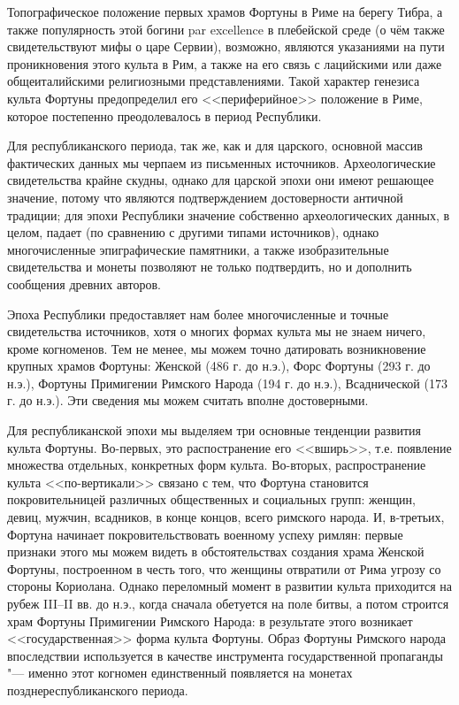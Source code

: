 Топографическое положение первых храмов Фортуны в Риме на берегу Тибра, а также популярность этой богини par excellence в плебейской среде (о чём также свидетельствуют мифы о царе Сервии), возможно, являются указаниями на пути проникновения этого культа в Рим, а также на его связь с лацийскими или даже общеиталийскими религиозными представлениями. Такой характер генезиса культа Фортуны предопределил его <<периферийное>> положение в Риме, которое постепенно преодолевалось в период Республики.


Для республиканского периода, так же, как и для царского, основной массив фактических данных мы черпаем из письменных источников. Археологические свидетельства крайне скудны, однако для царской эпохи они имеют решающее значение, потому что являются подтверждением достоверности античной традиции; для эпохи Республики значение собственно археологических данных, в целом, падает (по сравнению с другими типами источников), однако многочисленные эпиграфические памятники, а также изобразительные свидетельства и монеты позволяют не только подтвердить, но и дополнить сообщения древних авторов.

Эпоха Республики предоставляет нам более многочисленные и точные свидетельства источников, хотя о многих формах культа мы не знаем ничего, кроме когноменов. Тем не менее, мы можем точно датировать возникновение крупных храмов Фортуны: Женской (486 г. до н.э.), Форс Фортуны (293 г. до н.э.), Фортуны Примигении Римского Народа (194 г. до н.э.), Всаднической (173 г. до н.э.). Эти сведения мы можем считать вполне достоверными.

Для республиканской эпохи мы выделяем три основные тенденции развития культа Фортуны. Во-первых, это распостранение его <<вширь>>, т.е. появление множества отдельных, конкретных форм культа. Во-вторых, распространение культа <<по-вертикали>> связано с тем, что Фортуна становится покровительницей различных общественных и социальных групп: женщин, девиц, мужчин, всадников, в конце концов, всего римского народа. И, в-третьих, Фортуна начинает покровительствовать военному успеху римлян: первые признаки этого мы можем видеть в обстоятельствах создания храма Женской Фортуны, построенном в честь того, что женщины отвратили от Рима угрозу со стороны Кориолана. Однако переломный момент в развитии культа приходится на рубеж III--II вв. до н.э., когда сначала обетуется на поле битвы, а потом строится храм Фортуны Примигении Римского Народа: в результате этого возникает <<государственная>> форма культа Фортуны. Образ Фортуны Римского народа впоследствии используется в качестве инструмента государственной пропаганды "--- именно этот когномен единственный появляется на монетах позднереспубликанского периода.


